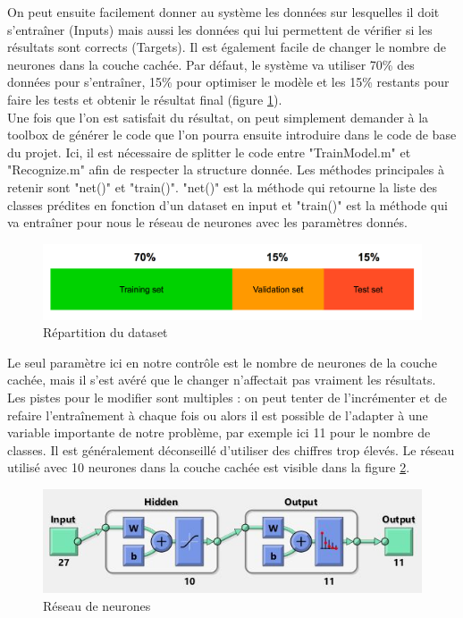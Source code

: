 On peut ensuite facilement donner au système les données sur lesquelles il doit s'entraîner (Inputs) mais aussi les données qui lui permettent de vérifier si les résultats sont corrects (Targets). Il est également facile de changer le nombre de neurones dans la couche cachée. Par défaut, le système va utiliser 70\% des données pour s'entraîner, 15\% pour optimiser le modèle et les 15\% restants pour faire les tests et obtenir le résultat final (figure \ref{fig:dataset_split}). \\

Une fois que l'on est satisfait du résultat, on peut simplement demander à la toolbox de générer le code que l'on pourra ensuite introduire dans le code de base du projet. Ici, il est nécessaire de splitter le code entre "TrainModel.m" et "Recognize.m" afin de respecter la structure donnée. Les méthodes principales à retenir sont "net()" et "train()". "net()" est la méthode qui retourne la liste des classes prédites en fonction d'un dataset en input et "train()" est la méthode qui va entraîner pour nous le réseau de neurones avec les paramètres donnés.\\

\begin{figure}[h]
  \centering
    \includegraphics[width=0.8\linewidth]{img/ann/train/ann_repartition.png}
  \caption{Répartition du dataset}
  \label{fig:dataset_split}
\end{figure}

Le seul paramètre ici en notre contrôle est le nombre de neurones de la couche cachée, mais il s'est avéré que le changer n'affectait pas vraiment les résultats. Les pistes pour le modifier sont multiples : on peut tenter de l'incrémenter et de refaire l'entraînement à chaque fois ou alors il est possible de l'adapter à une variable importante de notre problème, par exemple ici 11 pour le nombre de classes. Il est généralement déconseillé d'utiliser des chiffres trop élevés. Le réseau utilisé avec 10 neurones dans la couche cachée est visible dans la figure \ref{fig:network_view}.

\begin{figure}[h]
  \centering
    \includegraphics[width=0.8\linewidth]{img/ann/train/network_view.jpg}
  \caption{Réseau de neurones}
  \label{fig:network_view}
\end{figure}

